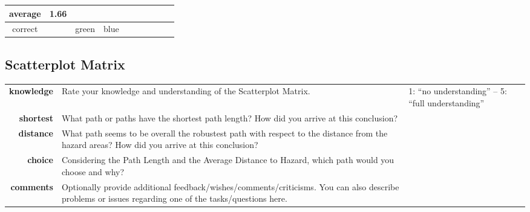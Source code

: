 \documentclass[8pt]{article}
\begin{document}
\begin{longtable}{|c|c|c|p{2.25cm}|p{2.5cm}|p{2.25cm}|p{2.25cm}|p{2.25cm}|p{2.25cm}|p{2.25cm}|}
average & 1.66 & & & & && & & \\ \hline
correct & & green & blue & & & & & & \\ \hline
 \end{longtable}


\newpage
%
%
\subsection*{Scatterplot Matrix}
\begin{longtable}{r p{15cm} l}
\hline
\textbf{knowledge} & Rate your knowledge and understanding of the Scatterplot Matrix. & 1: ``no understanding'' -- 5: ``full understanding''	\\
\textbf{shortest} & What path or paths have the shortest path length? How did you arrive at this conclusion?\\
\textbf{distance} & What path seems to be overall the robustest path with respect to the distance from the hazard areas? How did you arrive at this conclusion? \\
\textbf{choice} & Considering the Path Length and the Average Distance to Hazard, which path would you choose and why?\\
\textbf{comments} & Optionally provide additional feedback/wishes/comments/criticisms.
You can also describe problems or issues regarding one of the tasks/questions here.\\
\hline
\end{longtable}
\end{document}
